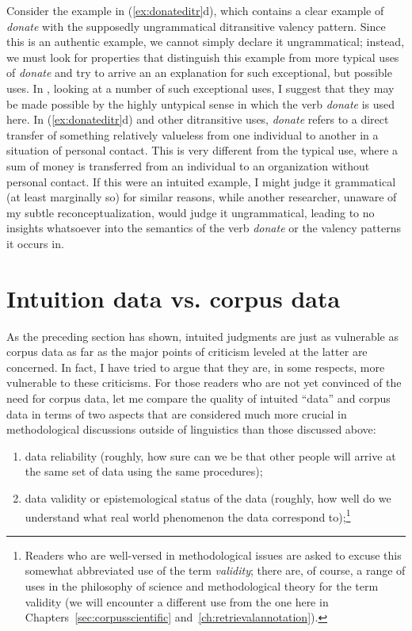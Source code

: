 Consider the example in (\ref{ex:donateditr}d), which contains a clear example of \textit{donate} with the supposedly ungrammatical  ditransitive  valency  pattern. Since this is an authentic  example, we cannot simply declare it ungrammatical; instead, we must look for properties that distinguish this example from more typical uses of \textit{donate} and try to arrive an an explanation  for such exceptional, but possible uses. In \citet{stefanowitsch_linguistics_2007}, looking at a number of such exceptional uses, I suggest that they may be made possible by the highly untypical sense in which the verb  \textit{donate }is used here. In (\ref{ex:donateditr}d) and other ditransitive  uses, \textit{donate} refers to a direct transfer of something relatively valueless from one individual to another in a situation of personal contact. This is very different from the typical use, where a sum of money is transferred from an individual to an organization without personal contact. If this were an intuited  example, I might judge it grammatical (at least marginally so) for similar reasons, while another researcher, unaware of my subtle reconceptualization, would judge it ungrammatical,  leading to no insights whatsoever into the semantics  of the verb \textit{donate} or the valency  patterns it occurs in.

\section{Intuition data vs. corpus data}\label{sec:intuitiondatavscorpusdata}

As the preceding section has shown, intuited  judgments are just as vulnerable as corpus data as far as the major points of criticism leveled at the latter are concerned. In fact, I have tried to argue that they are, in some respects, more vulnerable to these criticisms. For those readers who are not yet convinced of the need for corpus data, let me compare the quality of intuited ``data'' and corpus data in terms of two aspects that are considered much more crucial in methodological discussions outside of linguistics than those discussed above:

\begin{enumerate}
\item data reliability  (roughly, how sure can we be that other people will arrive at the same set of data using the same procedures);
\item data validity  or epistemological  status of the data (roughly, how well do we understand what real world phenomenon the data correspond to);\footnote{Readers who are well\hyp{}versed in methodological issues are asked to excuse this somewhat abbreviated use of the term \textit{validity};  there are, of course, a range of uses in the philosophy of science and methodological theory for the term validity (we will encounter a different use from the one here in Chapters~\ref{sec:corpusscientific} and~\ref{ch:retrievalannotation}).}
\end{enumerate}

